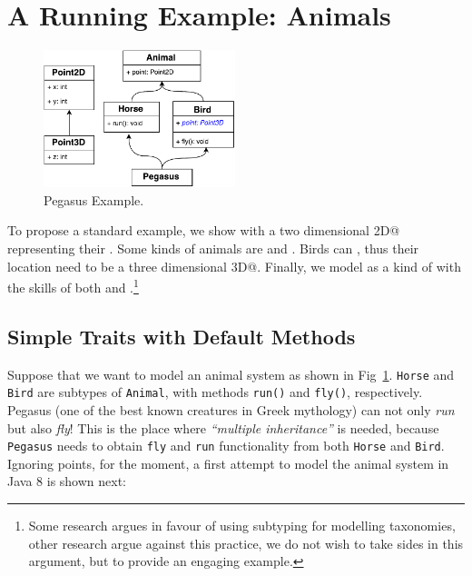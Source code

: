\section{A Running Example: Animals}\label{sec:ep}

\begin{figure}
\centering
\includegraphics[height=4cm]{PegasusDetail.pdf}
\caption{Pegasus Example.}\label{fig:pegasus}
\end{figure}

To propose a standard example, we show \Q@Animal@s with a two dimensional \Q@Point2D@ representing their \Q@location@.
Some kinds of animals are \Q@Horse@s and \Q@Bird@s.
Birds can \Q@fly@, thus their location need to be a three dimensional \Q@Point3D@.
Finally, we model \Q@Pegasus@ as a kind of \Q@Animal@ with the skills of both \Q@Horse@s and \Q@Bird@s.\footnote{
Some research argues in favour of using subtyping for modelling taxonomies, other research argue against this practice, we do not wish to take sides in this argument, but to provide an engaging example.}

\subsection{Simple Traits with Default Methods}

Suppose that we want to model an animal system as shown in
Fig~\ref{fig:pegasus}. \texttt{Horse} and \texttt{Bird} are subtypes
of \texttt{Animal}, with methods \texttt{run()} and \texttt{fly()},
respectively. Pegasus (one of the best known creatures in Greek
mythology) can not only \emph{run} but also \emph{fly}! This is the
place where \emph{``multiple inheritance''} is needed, because
\texttt{Pegasus} needs to obtain \texttt{fly} and \texttt{run}
functionality from both \texttt{Horse} and \texttt{Bird}.
Ignoring points, for the moment, a 
first attempt to model the animal system in Java 8 is shown next:

